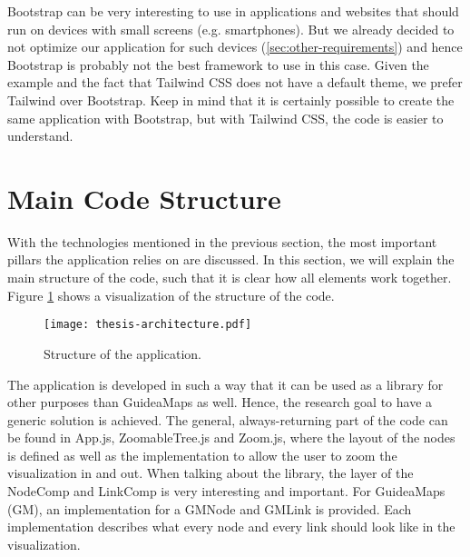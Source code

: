 Bootstrap can be very interesting to use in applications and websites that should run on devices with small screens (e.g. smartphones). But we already decided to not optimize our application for such devices (\ref{sec:other-requirements}) and hence Bootstrap is probably not the best framework to use in this case. Given the example and the fact that Tailwind CSS does not have a default theme, we prefer Tailwind over Bootstrap. Keep in mind that it is certainly possible to create the same application with Bootstrap, but with Tailwind CSS, the code is easier to understand.\\





\section{Main Code Structure}\label{sec:structure}
With the technologies mentioned in the previous section, the most important pillars the application relies on are discussed. In this section, we will explain the main structure of the code, such that it is clear how all elements work together. Figure \ref{fig:overall-structure} shows a visualization of the structure of the code.
\begin{figure}[H]
	\centering
	\texttt{[image: thesis-architecture.pdf]}
	\caption{Structure of the application.}
	\label{fig:overall-structure}
\end{figure}

The application is developed in such a way that it can be used as a library for other purposes than GuideaMaps as well. Hence, the research goal to have a generic solution is achieved. The general, always-returning part of the code can be found in App.js, ZoomableTree.js and Zoom.js, where the layout of the nodes is defined as well as the implementation to allow the user to zoom the visualization in and out. When talking about the library, the layer of the NodeComp and LinkComp is very interesting and important. For GuideaMaps (GM), an implementation for a GMNode and GMLink is provided. Each implementation describes what every node and every link should look like in the visualization.\\


